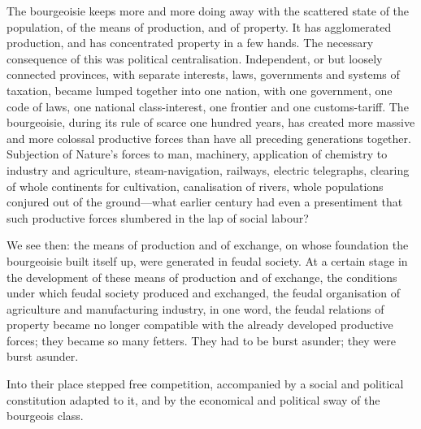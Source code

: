 The bourgeoisie keeps more and more doing away with the scattered state
of the population, of the means of production, and of property. It has
agglomerated production, and has concentrated property in a few hands.
The necessary consequence of this was political centralisation.
Independent, or but loosely connected provinces, with separate
interests, laws, governments and systems of taxation, became lumped
together into one nation, with one government, one code of laws, one
national class-interest, one frontier and one customs-tariff. The
bourgeoisie, during its rule of scarce one hundred years, has created
more massive and more colossal productive forces than have all
preceding generations together. Subjection of Nature’s forces to man,
machinery, application of chemistry to industry and agriculture,
steam-navigation, railways, electric telegraphs, clearing of whole
continents for cultivation, canalisation of rivers, whole populations
conjured out of the ground—what earlier century had even a presentiment
that such productive forces slumbered in the lap of social labour?

We see then: the means of production and of exchange, on whose
foundation the bourgeoisie built itself up, were generated in feudal
society. At a certain stage in the development of these means of
production and of exchange, the conditions under which feudal society
produced and exchanged, the feudal organisation of agriculture and
manufacturing industry, in one word, the feudal relations of property
became no longer compatible with the already developed productive
forces; they became so many fetters. They had to be burst asunder; they
were burst asunder.

Into their place stepped free competition, accompanied by a social and
political constitution adapted to it, and by the economical and
political sway of the bourgeois class.

